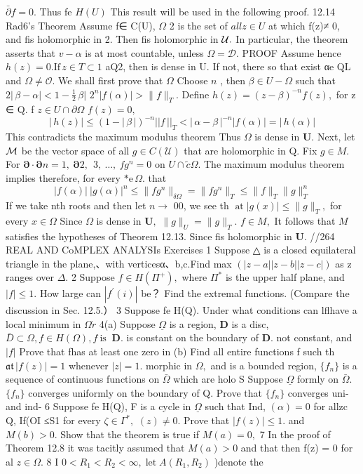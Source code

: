 ${\bar{\partial}}f=0.$ Thus fe $H(U)$ This result will be used in the following proof. 12.14 Rad6's Theorem Assume f∈ C(U), $\Omega$ 2 is the set of $a l l z\in U$ at which f(z)≠ 0, and fis holomorphic in 2. Then fis holomorphic in ${\cal U}.$ In particular, the theorem asserts that $v-\alpha$ is at most countable, unless $\Omega=\mathcal{D}.$ PROOF Assume hence $h(z)=0.\mathrm{If}\,z\in T\subset1$ aQ2, then is dense in U. If not, there so that exist αe QL and $\Omega\neq{\mathcal{O}}.$ We shall first prove that $\Omega$ Choose $\scriptstyle n$ , then $\beta\in U-\Omega$ such that $2\vert\,\beta-\alpha\vert<1-{\frac{1}{2}}\,\beta\vert$ $2^{n}|f(\alpha)|>\|f\|_{T}.$ Define $h(z)=(z-\beta)^{-n}f(z),$ for z ∈ Q. f $z\in U\cap\partial\Omega$ $f(z)=0,$ $$ |\,h(z)|\leq(1-|\,\beta\,|)^{-n}||f\,||_{T}<|\,\alpha-\beta\,|^{-n}|f(\alpha)|=|\,h(\alpha)| $$ This contradicts the maximum modulus theorem Thus $\Omega$ is dense in ${\boldsymbol{U}}.$ Next, let ${\cal M}$ be the vector space of all $g\in C({\mathcal{U}})$ that are holomorphic in Q. Fix $g\in M.$ For $\mathbf{\partial}\cdot\mathbf{\partial}n=1,\ \mathbf{\partial}2,\ \ 3,\ \ldots,\ f g^{n}=0$ on $U\cap\tilde{c}\Omega.$ The maximum modulus theorem implies therefore, for every $\mathrm{*e}\,\Omega.$ that $$ |f(\alpha)|\ |g(\alpha)|^{n}\leq\|f g^{n}\|_{\delta\Omega}=\|f g^{n}\|_{T}\leq\|f\|_{T}\|g\|_{T}^{n} $$ If we take nth roots and then let $\textstyle n\!\to$ 00, we see th $\operatorname{at}|g(x)|\leq\|g\|_{T},$ for every $\scriptstyle x\in\Omega$ Since $\Omega$ is dense in ${\boldsymbol{U}},$ $\|g\|_{U}=\|g\|_{T}.$ $f\in M,$ It follows that $\textstyle{M}$ satisfies the hypotheses of Theorem 12.13. Since fis holomorphic in ${\boldsymbol{U}}.$ //264 REAL AND CoMPLEX ANALYSIs Exercises 1 Suppose △ is a closed equilateral triangle in the plane,、with verticesα、b,c.Find max $(|z-a|\left|z-b\right|\left|z-c\right|)$ as z ranges over $\Delta.$ 2 Suppose $f\in H(\Pi^{+}),$ where $\Pi^{*}$ is the upper half plane, and $|f|\leq1.$ How large can $|f^{\prime}(i)|$ be？ Find the extremal functions. (Compare the discussion in Sec. 12.5.） 3 Suppose fe H(Q). Under what conditions can lflhave a local minimum in $\Omega{\dot{r}}$ 4(a) Suppose $\underline{{\Omega}}$ is a region, ${\boldsymbol{D}}$ is a disc, ${\bar{D}}\subset\Omega,f\in H(\Omega),f{\mathrm{~is~}}$ ${\boldsymbol{D}}.$ is constant on the boundary of ${\boldsymbol{D}}.$ not constant, and $|f|$ Prove that fhas at least one zero in (b) Find all entire functions f such th ${\mathfrak{a t}}\,|f(z)|=1$ whenever $|z|=1.$ morphic in $\Omega,$ and is a bounded region, $\{f_{n}\}$ is a sequence of continuous functions on $\bar{\Omega}$ which are holo S Suppose $\underline{{\Omega}}$ formly on ${\bar{\Omega}}.$ $\{f_{n}\}$ converges uniformly on the boundary of Q. Prove that $\{f_{n}\}$ converges uni- and ind- 6 Suppose fe H(Q), F is a cycle in $\underline{{\Omega}}$ such that Ind, $(\alpha)=0$ for allzc Q, If(OI ≤S1 for every $\zeta\in\Gamma^{*},$ $(z)\neq0.$ Prove that $|f(z)|\leq1.$ and $M(b)>0.$ Show that the theorem is true if $M(a)=0,$ 7 In the proof of Theorem 12.8 it was tacitly assumed that $M(a)>0$ and that then f(z) = 0 for al $z\in\Omega.$ 8 I $0<R_{1}<R_{2}<\infty,\operatorname{let}A(R_{1},R_{2})$ )denote the 